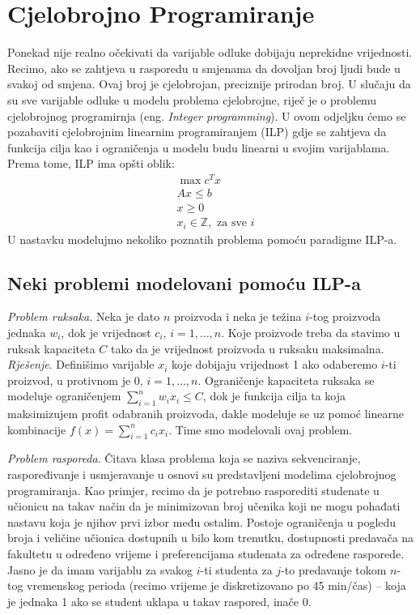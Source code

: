 \documentclass[a4paper, utf8, 11pt, colorlinks]{article}
\begin{document}
\section{Cjelobrojno Programiranje}

Ponekad nije realno očekivati da varijable odluke dobijaju neprekidne vrijednosti. Recimo, ako se zahtjeva u rasporedu u smjenama da dovoljan broj ljudi bude u svakoj od smjena. Ovaj broj je cjelobrojan, preciznije prirodan broj. U slučaju da su sve varijable odluke u modelu problema cjelobrojne, riječ je o problemu cjelobrojnog programirnja (eng. \emph{Integer programming}). 
U ovom odjeljku ćemo se pozabaviti   cjelobrojnim linearnim programiranjem (ILP) gdje se zahtjeva da funkcija cilja kao i ograničenja u modelu budu linearni u svojim varijablama. Prema tome, ILP ima opšti oblik:
\begin{align}
    & \max c^T x \nonumber\\
    & A x \leq b \nonumber \\
    & x \geq 0 \nonumber\\
    & x_i \in \mathbb{Z}, \mbox{ za sve } i \label{ilp-formulation}
\end{align}
U nastavku modelujmo nekoliko poznatih problema pomoću paradigme ILP-a.

\subsection{Neki problemi modelovani pomoću ILP-a}

\emph{Problem ruksaka.} Neka je dato $n$ proizvoda i neka je težina $i$-tog proizvoda jednaka $w_i$, dok je vrijednost $c_i$, $i=1,\ldots,n$. Koje proizvode treba da stavimo u ruksak kapaciteta $C$ tako da je vrijednost proizvoda u ruksaku maksimalna. \\
\emph{Rješenje}. Definišimo varijable $x_i$ koje dobijaju vrijednost 1 ako odaberemo $i$-ti proizvod, u protivnom je 0, $i=1,\ldots,n$. Ograničenje kapaciteta ruksaka se modeluje ograničenjem $\sum_{i=1}^n w_i x_i \leq C$, dok je funkcija cilja ta koja maksimizujem profit odabranih proizvoda, dakle modeluje se uz pomoć linearne kombinacije $f(x) = \sum_{i=1}^n c_i x_i$. Time smo modelovali ovaj problem.

\emph{Problem rasporeda}. Čitava klasa problema koja se naziva sekvenciranje, raspoređivanje i usmjeravanje u osnovi su predstavljeni modelima cjelobrojnog programiranja. Kao primjer, recimo da je potrebno rasporediti studenate u  učionicu na takav način
da je minimizovan broj učenika koji ne mogu pohađati nastavu koja je njihov prvi izbor među ostalim. Postoje ograničenja u pogledu broja i veličine učionica dostupnih u bilo kom trenutku, dostupnosti predavača na fakultetu u određeno vrijeme i preferencijama studenata za određene rasporede. Jasno je da imam varijablu za svakog $i$-ti studenta 
za $j$-to predavanje tokom $n$-tog vremenskog perioda (recimo vrijeme je diskretizovano po 45 min/čas) -- koja je jednaka 1 ako se student uklapa u takav raspored, inače 0. 
\end{document}
